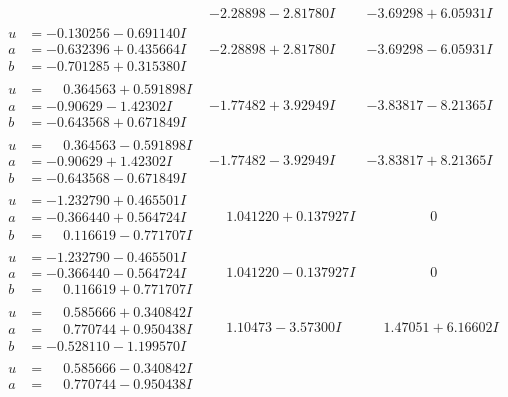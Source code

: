 \documentclass[1p]{elsarticle_modified}
\theoremstyle{definition}
\begin{document}
$$\begin{array}{c|c|c}
 & -2.28898 - 2.81780 I & -3.69298 + 6.05931 I \\ \hline\begin{aligned}
u &= -0.130256 - 0.691140 I \\
a &= -0.632396 + 0.435664 I \\
b &= -0.701285 + 0.315380 I\end{aligned}
 & -2.28898 + 2.81780 I & -3.69298 - 6.05931 I \\ \hline\begin{aligned}
u &= \phantom{-}0.364563 + 0.591898 I \\
a &= -0.90629 - 1.42302 I \\
b &= -0.643568 + 0.671849 I\end{aligned}
 & -1.77482 + 3.92949 I & -3.83817 - 8.21365 I \\ \hline\begin{aligned}
u &= \phantom{-}0.364563 - 0.591898 I \\
a &= -0.90629 + 1.42302 I \\
b &= -0.643568 - 0.671849 I\end{aligned}
 & -1.77482 - 3.92949 I & -3.83817 + 8.21365 I \\ \hline\begin{aligned}
u &= -1.232790 + 0.465501 I \\
a &= -0.366440 + 0.564724 I \\
b &= \phantom{-}0.116619 - 0.771707 I\end{aligned}
 & \phantom{-}1.041220 + 0.137927 I & \phantom{-0.000000 } 0 \\ \hline\begin{aligned}
u &= -1.232790 - 0.465501 I \\
a &= -0.366440 - 0.564724 I \\
b &= \phantom{-}0.116619 + 0.771707 I\end{aligned}
 & \phantom{-}1.041220 - 0.137927 I & \phantom{-0.000000 } 0 \\ \hline\begin{aligned}
u &= \phantom{-}0.585666 + 0.340842 I \\
a &= \phantom{-}0.770744 + 0.950438 I \\
b &= -0.528110 - 1.199570 I\end{aligned}
 & \phantom{-}1.10473 - 3.57300 I & \phantom{-}1.47051 + 6.16602 I \\ \hline\begin{aligned}
u &= \phantom{-}0.585666 - 0.340842 I \\
a &= \phantom{-}0.770744 - 0.950438 I \\

\end{aligned}
\end{array}$$
\end{document}
